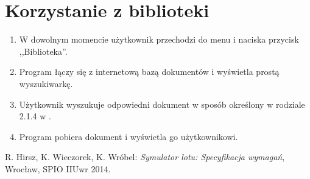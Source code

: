 \documentclass{mwrep}
\begin{document}
\section{Korzystanie z biblioteki}
\begin{enumerate}
  \item W dowolnym momencie użytkownik przechodzi do menu i naciska przycisk ,,Biblioteka''.
  \item Program łączy się z internetową bazą dokumentów i wyświetla prostą wyszukiwarkę.
  \item Użytkownik wyszukuje odpowiedni dokument w sposób określony w rodziale 2.1.4 w \cite{WYM}.
  \item Program pobiera dokument i wyświetla go użytkownikowi.
\end{enumerate}

\begin{thebibliography}{9}
   R. Hirsz, K. Wieczorek, K. Wróbel: \textit{Symulator lotu: Specyfikacja wymagań}, Wrocław, SPIO IIUwr 2014.
\end{thebibliography}
\end{document}
